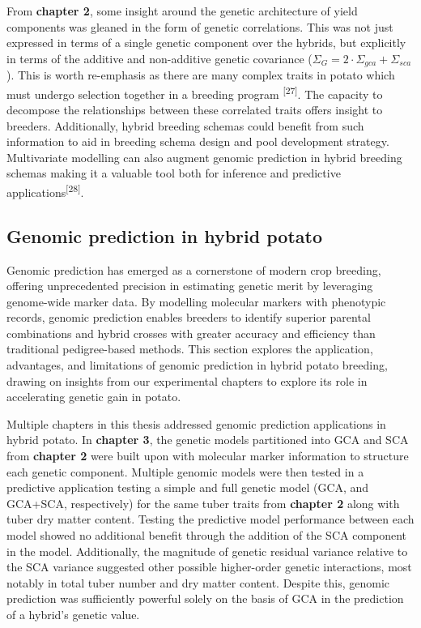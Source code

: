 From \textbf{chapter 2}, some insight around the genetic architecture of
yield components was gleaned in the form of genetic correlations. This
was not just expressed in terms of a single genetic component over the
hybrids, but explicitly in terms of the additive and non-additive
genetic covariance (\(\Sigma_G = 2 \cdot \Sigma_{gca} + \Sigma_{sca}\)).
This is worth re-emphasis as there are many complex traits in potato which must undergo selection together in a breeding program \textsuperscript{{[}27{]}}. The capacity to decompose the relationships between these correlated traits offers insight to breeders. Additionally, hybrid breeding schemas could benefit from such information to aid in breeding schema design and pool development strategy. Multivariate modelling can also augment genomic prediction in hybrid breeding schemas making it a valuable tool both for inference and predictive applications\textsuperscript{{[}28{]}}.

\subsection{Genomic prediction in hybrid
potato}\label{genomic-prediction-in-hybrid-potato}

Genomic prediction has emerged as a cornerstone of modern crop breeding,
offering unprecedented precision in estimating genetic merit by
leveraging genome-wide marker data. By modelling molecular markers with
phenotypic records, genomic prediction enables breeders to identify
superior parental combinations and hybrid crosses with greater accuracy
and efficiency than traditional pedigree-based methods. This section
explores the application, advantages, and limitations of genomic
prediction in hybrid potato breeding, drawing on insights from our
experimental chapters to explore its role in accelerating genetic gain
in potato.

Multiple chapters in this thesis addressed genomic prediction
applications in hybrid potato. In \textbf{chapter 3}, the genetic models
partitioned into GCA and SCA from \textbf{chapter 2} were built upon
with molecular marker information to structure each
genetic component. Multiple genomic models were then tested in a
predictive application testing a simple and full genetic model (GCA, and
GCA+SCA, respectively) for the same tuber traits from \textbf{chapter
2} along with tuber dry matter content. Testing the predictive model
performance between each model showed no additional benefit through the
addition of the SCA component in the model. Additionally, the magnitude of genetic residual variance relative to the SCA variance suggested other possible higher-order genetic interactions,
most notably in total tuber number and dry matter content. Despite this, genomic prediction was sufficiently powerful solely on the basis of GCA in the prediction of a hybrid's genetic value.

